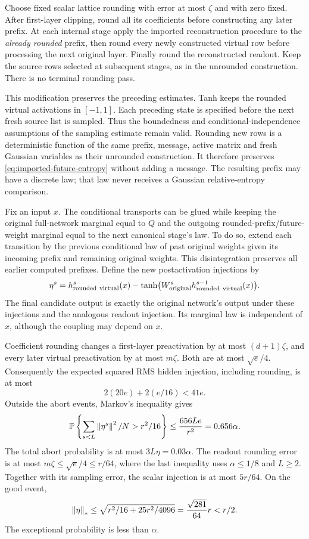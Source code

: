 Choose fixed scalar lattice rounding with error at most $\zeta$ and
with zero fixed. After first-layer clipping, round all its coefficients
before constructing any later prefix. At each internal stage apply the
imported reconstruction procedure to the \emph{already rounded} prefix,
then round every newly constructed virtual row before processing the
next original layer. Finally round the reconstructed readout. Keep the
source rows selected at subsequent stages, as in the unrounded
construction. There is no terminal rounding pass.

This modification preserves the preceding estimates. Tanh keeps the
rounded virtual activations in $[-1,1]$. Each preceding state is
specified before the next fresh source list is sampled. Thus the
boundedness and conditional-independence assumptions of the sampling
estimate remain valid. Rounding new rows is a deterministic function
of the same prefix, message, active matrix and fresh Gaussian variables
as their unrounded construction. It therefore preserves
\eqref{eq:imported-future-entropy} without adding a message.
The resulting prefix may have a discrete law; that law never receives
a Gaussian relative-entropy comparison.

Fix an input $x$. The conditional transports can be glued while keeping
the original full-network marginal equal to $Q$ and the outgoing
rounded-prefix/future-weight marginal equal to the next canonical
stage's law. To do so, extend each transition by the previous
conditional law of past original weights given its incoming prefix and
remaining original weights. This disintegration preserves all earlier
computed prefixes. Define the new postactivation injections by
\[
 \eta^s=h^s_{\rm rounded\ virtual}(x)
       -\tanh\bigl(W^s_{\rm original}
                         h^{s-1}_{\rm rounded\ virtual}(x)\bigr).
\]
The final candidate output is exactly the original network's output
under these injections and the analogous readout injection. Its
marginal law is independent of $x$, although the coupling may depend
on $x$.

Coefficient rounding changes a first-layer preactivation by at most
$(d+1)\zeta$, and every later virtual preactivation by at most
$m\zeta$. Both are at most $\sqrt e/4$. Consequently the expected
squared RMS hidden injection, including rounding, is at most
\[
 2(20e)+2(e/16)<41e.
\]
Outside the abort events, Markov's inequality gives
\[
 \mathbb P\left\{\sum_{s<L}\left\|\eta^s\right\|^2/N>r^2/16\right\}
 \le\frac{656Le}{r^2}=0.656\alpha.
\]
The total abort probability is at most $3L\eta=0.03\alpha$.
The readout rounding error is at most $m\zeta\le\sqrt e/4\le r/64$,
where the last inequality uses $\alpha\le1/8$ and $L\ge2$.
Together with its sampling error, the scalar injection is at most
$5r/64$. On the good event,
\[
 \left\|\eta\right\|_*\le\sqrt{r^2/16+25r^2/4096}
       =\frac{\sqrt{281}}{64}r<r/2.
\]
The exceptional probability is less than $\alpha$.

